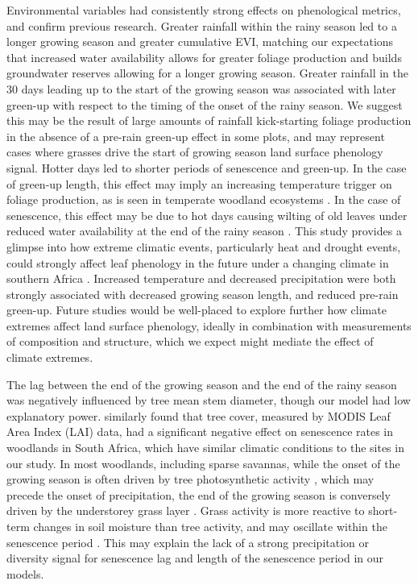 \documentclass[11pt,a4paper]{article}
\begin{document}
Environmental variables had consistently strong effects on phenological
metrics, and confirm previous research. Greater rainfall within the rainy
season led to a longer growing season and greater cumulative EVI, matching our
expectations that increased water availability allows for greater foliage
production and builds groundwater reserves allowing for a longer growing
season. Greater rainfall in the 30 days leading up to the start of the growing
season was associated with later green-up with respect to the timing of the
onset of the rainy season. We suggest this may be the result of large amounts
of rainfall kick-starting foliage production in the absence of a pre-rain
green-up effect in some plots, and may represent cases where grasses drive the
start of growing season land surface phenology signal. Hotter days led to
shorter periods of senescence and green-up. In the case of green-up length,
this effect may imply an increasing temperature trigger on foliage production,
as is seen in temperate woodland ecosystems \citep{Flynn2018}. In the case of
senescence, this effect may be due to hot days causing wilting of old leaves
under reduced water availability at the end of the rainy season
\citep{Warren2011, Marin2019}. This study provides a glimpse into how extreme
climatic events, particularly heat and drought events, could strongly affect
leaf phenology in the future under a changing climate in southern Africa
\citep{Naumann2018}. Increased temperature and decreased precipitation were
both strongly associated with decreased growing season length, and reduced
pre-rain green-up. Future studies would be well-placed to explore further how
climate extremes affect land surface phenology, ideally in combination with
measurements of composition and structure, which we expect might mediate the
effect of climate extremes.

The lag between the end of the growing season and the end of the rainy season
was negatively influenced by tree mean stem diameter, though our model had low
explanatory power. \citet{Cho2017} similarly found that tree cover, measured by
MODIS Leaf Area Index (LAI) data, had a significant negative effect on
senescence rates in woodlands in South Africa, which have similar climatic
conditions to the sites in our study. In most woodlands, including sparse
savannas, while the onset of the growing season is often driven by tree
photosynthetic activity \citep{Ryan2017, Archibald2007, Chidumayo2001}, which
may precede the onset of precipitation, the end of the growing season is
conversely driven by the understorey grass layer \citep{Cho2017, Guan2014}.
Grass activity is more reactive to short-term changes in soil moisture than
tree activity, and may oscillate within the senescence period
\citep{Archibald2007}. This may explain the lack of a strong precipitation or
diversity signal for senescence lag and length of the senescence period in our
models.
\end{document}
